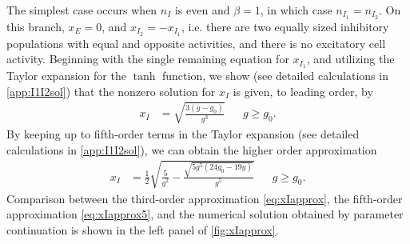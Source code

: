 \documentclass[reqno]{siamonline190516}
\begin{document}
The simplest case occurs when $n_I$ is even and $\beta = 1$, in which case $n_{I_1}=n_{I_2}$. On this branch, $x_E = 0$, and $x_{I_2} = -x_{I_1}$, i.e. there are two equally sized inhibitory populations with equal and opposite activities, and there is no excitatory cell activity. Beginning with the single remaining equation for $x_{I_1}$, and utilizing the Taylor expansion for the $\tanh$ function, we show (see detailed calculations in \cref{app:I1I2sol}) that the nonzero solution for $x_I$ is given, to leading order, by
\begin{align}\label{eq:xIapprox}
x_I &= \sqrt{ \frac{3(g - g_0) }{g^3}} && g \geq g_0.
\end{align}
By keeping up to fifth-order terms in the Taylor expansion (see detailed calculations in \cref{app:I1I2sol}), we can obtain the higher order approximation
\begin{align}\label{eq:xIapprox5}
x_I &= \frac{1}{2} \sqrt{ \frac{5}{g^2} - \frac{\sqrt{ 5 g^5( 24 g_0 - 19 g) }}{g^5}} && g \geq g_0.
\end{align}
Comparison between the third-order approximation \cref{eq:xIapprox}, the fifth-order approximation \cref{eq:xIapprox5}, and the numerical solution obtained by parameter continuation is shown in the left panel of \cref{fig:xIapprox}.
\end{document}
